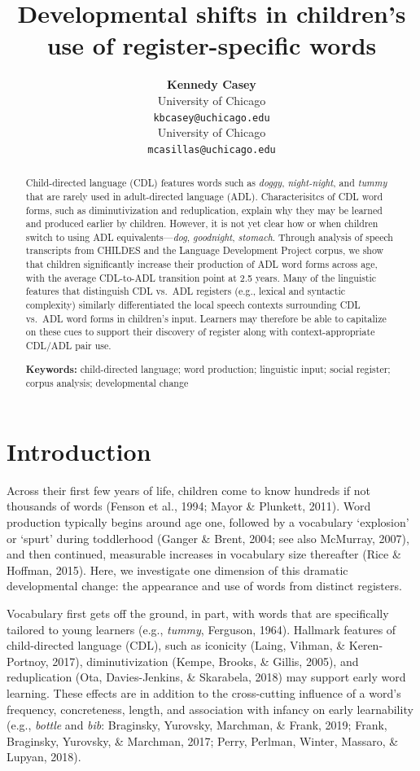 \documentclass[10pt, letterpaper]{article}
\title{Developmental shifts in children's use of register-specific
words}
\author{{\large \bf Kennedy Casey} \\ University of Chicago \\ \texttt{kbcasey@uchicago.edu} \And {\large \bf Marisa Casillas} \\ University of Chicago \\ \texttt{mcasillas@uchicago.edu}}
\begin{document}
\maketitle

\begin{abstract}
Child-directed language (CDL) features words such as \emph{doggy},
\emph{night-night}, and \emph{tummy} that are rarely used in
adult-directed language (ADL). Characterisitcs of CDL word forms, such
as diminutivization and reduplication, explain why they may be learned
and produced earlier by children. However, it is not yet clear how or
when children switch to using ADL equivalents---\emph{dog},
\emph{goodnight}, \emph{stomach}. Through analysis of speech transcripts
from CHILDES and the Language Development Project corpus, we show that
children significantly increase their production of ADL word forms
across age, with the average CDL-to-ADL transition point at 2.5 years.
Many of the linguistic features that distinguish CDL vs.~ADL registers
(e.g., lexical and syntactic complexity) similarly differentiated the
local speech contexts surrounding CDL vs.~ADL word forms in children's
input. Learners may therefore be able to capitalize on these cues to
support their discovery of register along with context-appropriate
CDL/ADL pair use.

\textbf{Keywords:}
child-directed language; word production; linguistic input; social
register; corpus analysis; developmental change
\end{abstract}

\hypertarget{introduction}{%
\section{Introduction}\label{introduction}}

Across their first few years of life, children come to know hundreds if
not thousands of words (Fenson et al., 1994; Mayor \& Plunkett, 2011).
Word production typically begins around age one, followed by a
vocabulary `explosion' or `spurt' during toddlerhood (Ganger \& Brent,
2004; see also McMurray, 2007), and then continued, measurable increases
in vocabulary size thereafter (Rice \& Hoffman, 2015). Here, we
investigate one dimension of this dramatic developmental change: the
appearance and use of words from distinct registers.

Vocabulary first gets off the ground, in part, with words that are
specifically tailored to young learners (e.g., \emph{tummy}, Ferguson,
1964). Hallmark features of child-directed language (CDL), such as
iconicity (Laing, Vihman, \& Keren-Portnoy, 2017), diminutivization
(Kempe, Brooks, \& Gillis, 2005), and reduplication (Ota,
Davies-Jenkins, \& Skarabela, 2018) may support early word learning.
These effects are in addition to the cross-cutting influence of a word's
frequency, concreteness, length, and association with infancy on early
learnability (e.g., \emph{bottle} and \emph{bib}: Braginsky, Yurovsky,
Marchman, \& Frank, 2019; Frank, Braginsky, Yurovsky, \& Marchman, 2017;
Perry, Perlman, Winter, Massaro, \& Lupyan, 2018).
\end{document}
